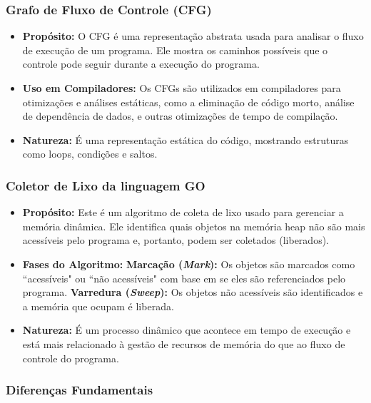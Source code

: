 \documentclass{article}
\begin{document}
    \subsubsection*{Grafo de Fluxo de Controle (CFG)}

    \begin{itemize}
        \item \textbf{Propósito:} O CFG é uma representação abstrata usada para analisar o fluxo de execução de um programa.
        Ele mostra os caminhos possíveis que o controle pode seguir durante a execução do programa.

        \item \textbf{Uso em Compiladores:} Os CFGs são utilizados em compiladores para otimizações e análises estáticas,
        como a eliminação de código morto, análise de dependência de dados, e outras otimizações de tempo de compilação.

        \item \textbf{Natureza:} É uma representação estática do código, mostrando estruturas como loops, condições e saltos.
    \end{itemize}

    \subsubsection*{Coletor de Lixo da linguagem GO}

    \begin{itemize}
        \item \textbf{Propósito:} Este é um algoritmo de coleta de lixo usado para gerenciar a memória dinâmica.
        Ele identifica quais objetos na memória heap não são mais acessíveis pelo programa e,
        portanto, podem ser coletados (liberados).
        \item \textbf{Fases do Algoritmo:}
            \subitem \textbf{Marcação (\emph{Mark}):} Os objetos são marcados como ``acessíveis" ou ``não acessíveis"
            com base em se eles são referenciados pelo programa.
            \subitem \textbf{Varredura (\emph{Sweep}):} Os objetos não acessíveis são identificados e a memória que ocupam é liberada.
        \item \textbf{Natureza:}  É um processo dinâmico que acontece em tempo de execução e está mais
        relacionado à gestão de recursos de memória do que ao fluxo de controle do programa.

    \end{itemize}

    \subsubsection*{Diferenças Fundamentais}
\end{document}
